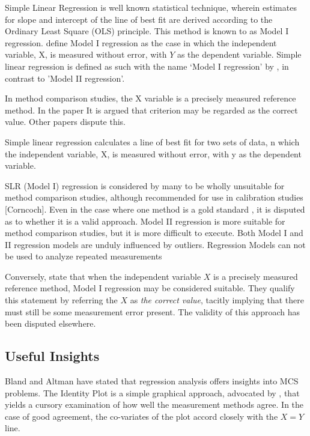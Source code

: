 \documentclass[12pt, a4paper]{report}
\theoremstyle{plain}
\theoremstyle{definition}
\theoremstyle{remark}
\begin{document}
	Simple Linear Regression is well known statistical technique, wherein estimates for slope and
	intercept of the line of best fit are derived according to the Ordinary Least Square (OLS) principle. This method is known to \citet{CornCoch} as Model I regression. \citet{CornCoch} define Model I regression as the case in which the independent variable, X, is measured without error, with $Y$ as the dependent
	variable. Simple linear regression is defined as such with the name `Model I regression' by \citet{CornCoch}, in contrast to 'Model II regression'.
	
	In method comparison studies, the X variable is a precisely measured reference method. In the \citet{CornCoch} paper It is argued that criterion may be regarded as the correct value. Other papers dispute this.
	
	
	
	
	
	Simple linear regression calculates a line of best fit for two
	sets of data, n which the independent variable, X, is measured without error, with y as the dependent variable.  
	
	SLR (Model I) regression is considered by many \citet{BA83,CornCoch,ludbrook97} to be wholly unsuitable for
	method comparison studies, although recommended for use in calibration studies [Corncoch]. Even in the case where one
	method is a gold standard , it is disputed as to whether it is a valid approach. Model II regression is more suitable for method comparison studies, but it is more difficult to execute. Both Model I and II regression models are unduly influenced by outliers. Regression Models can not be used to analyze repeated measurements
	
	
	Conversely, \citet{CornCoch} state that when the independent
	variable $X$ is a precisely measured reference method, Model I
	regression may be considered suitable. They qualify this statement
	by referring the $X$ as \emph{the correct value}, tacitly
	implying that there must still be some measurement error present.
	The validity of this approach has been disputed elsewhere.
	
	\subsection{Useful Insights}
Bland and Altman have stated that regression analysis offers insights into MCS problems.
The Identity Plot is a simple graphical approach, advocated by \citet{BA86}, that yields a cursory examination of how well the measurement methods agree. In the case of good agreement, the co-variates of the plot accord closely with the $X=Y$ line.
\end{document}

